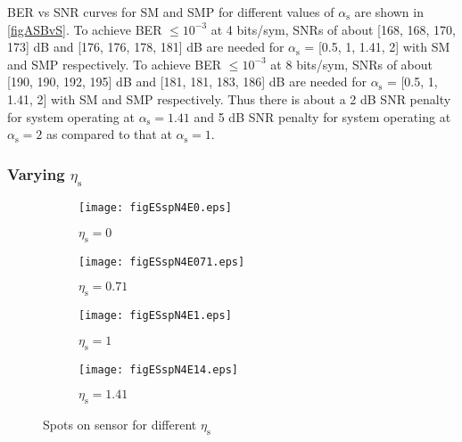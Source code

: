 BER vs SNR curves for SM and SMP for different values of $\alpha_{\text{s}}$ are shown in \figurename{ \ref{figASBvS}}. To achieve BER $\leq10^{-3}$ at 4 bits/sym, SNRs of about [168, 168, 170, 173] dB and [176, 176, 178, 181] dB are needed for $\alpha_{\text{s}}$ = [0.5, 1, 1.41, 2]  with SM and SMP respectively. To achieve BER $\leq10^{-3}$ at 8 bits/sym, SNRs of about [190, 190, 192, 195] dB and [181, 181, 183, 186] dB are needed for $\alpha_{\text{s}}$ = [0.5, 1, 1.41, 2] with SM and SMP respectively. Thus there is about a 2 dB SNR penalty for system operating at $\alpha_{\text{s}}=1.41$ and 5 dB SNR penalty for system operating at $\alpha_{\text{s}}=2$ as compared to that at $\alpha_{\text{s}}=1$.

\subsubsection{Varying $\eta_{\text{s}}$}
\label{subsubsec:osmResultsEta}
\begin{figure}[!t]
	\centering
		\begin{subfigure}{0.49\textwidth}
			\centering
			\texttt{[image: figESspN4E0.eps]}
			\caption{$\eta_{\text{s}}=0$}
			\label{figESspN4E0}
		\end{subfigure}
		\hfill
		\begin{subfigure}{0.49\textwidth}
			\centering
			\texttt{[image: figESspN4E071.eps]}
			\caption{$\eta_{\text{s}}=0.71$}
			\label{figESspN4E071}
		\end{subfigure}
		\vfill
		\begin{subfigure}{0.49\textwidth}
			\centering
			\texttt{[image: figESspN4E1.eps]}
			\caption{$\eta_{\text{s}}=1$}
			\label{figESspN4E1}
		\end{subfigure}
		\hfill
		\begin{subfigure}{0.49\textwidth}
			\centering
			\texttt{[image: figESspN4E14.eps]}
			\caption{$\eta_{\text{s}}=1.41$}
			\label{figESspN4E14}
		\end{subfigure}
		
		\caption{Spots on sensor for different $\eta_{\text{s}}$}
		\label{figESSpots}
\end{figure}



